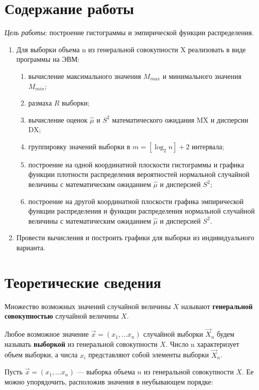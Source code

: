 \section*{Содержание работы}
\textit{Цель работы}: построение гистограммы и эмпирической функции распределения.
\begin{enumerate}[wide=0pt]
	\item Для выборки объема n из генеральной совокупности X реализовать в виде программы на ЭВМ:
	\begin{enumerate}
		\item вычисление максимального значения $M_{max}$ и минимального значения $M_{min}$;
		\item размаха $R$ выборки;
		\item вычисление оценок $\hat{\mu}$ и $S^2$ математического ожидания MX и дисперсии DX;
		\item группировку значений выборки в $m = [\log_2n] + 2$ интервала;
		\item построение на одной координатной плоскости гистограммы и графика функции плотности распределения вероятностей нормальной случайной величины с математическим ожиданием $\hat{\mu}$ и дисперсией $S^2$;
		\item построение на другой координатной плоскости графика эмпирической функции распределения и функции распределения нормальной случайной величины с математическим ожиданием $\hat{\mu}$ и дисперсией $S^2$.
	\end{enumerate}
	\item Провести вычисления и построить графики для выборки из индивидуального варианта.
\end{enumerate}

\section*{Теоретические сведения}

Множество возможных значений случайной величины $X$ называют \textbf{генеральной совокупностью} 
случайной величины $X$.

Любое возможное значение $\vec{x} = (x_1, \dots x_n)$ случайной выборки $\vec{X}_{n}$ будем называть \textbf{выборкой} из генеральной совокупности $X$. Число n характеризует объем выборки, а числа $x_i$ представляют собой элементы выборки $\vec{X}_{n}$.

Пусть $\vec{x} = (x_1, \dots x_n)$ — выборка объема $n$ из генеральной совокупности $X$. 
Ее можно упорядочить, расположив значения в неубывающем порядке:

